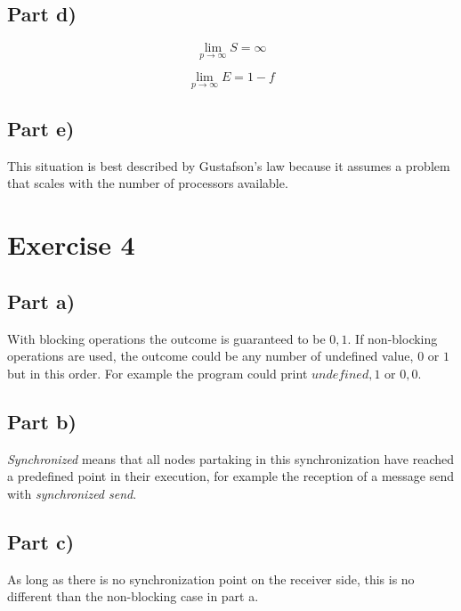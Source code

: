 \documentclass[10pt,a4paper]{article}
\begin{document}
\subsection*{Part d)}

\begin{equation*}
  \lim_{p \rightarrow \infty} S = \infty
\end{equation*}

\begin{equation*}
  \lim_{p \rightarrow \infty} E = 1 - f
\end{equation*}

\subsection*{Part e)}

This situation is best described by Gustafson's law because it assumes a problem that scales with the number of processors available.

\section*{Exercise 4}

\subsection*{Part a)}

With blocking operations the outcome is guaranteed to be $0, 1$.
If non-blocking operations are used, the outcome could be any number of undefined value, $0$ or $1$ but in this order.
For example the program could print $undefined, 1$ or $0, 0$.

\subsection*{Part b)}

\emph{Synchronized} means that all nodes partaking in this synchronization have reached a predefined point in their execution, for example the reception of a message send with \emph{synchronized send}.

\subsection*{Part c)}

As long as there is no synchronization point on the receiver side, this is no different than the non-blocking case in part a.
\end{document}
